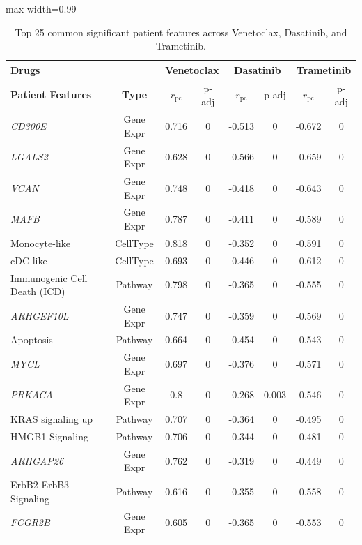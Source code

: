 \documentclass[sigconf,authordraft]{acmart}
\begin{document}
\begin{table}[!ht]
    \centering
    \caption{Top 25 common significant patient features across Venetoclax, Dasatinib, and Trametinib.}
    \label{tab:top25_top3_drugs}
    \scriptsize
    \begin{adjustbox}{max width=0.99\linewidth}
    \begin{tabular}{|l|c|c|c|c|c|c|c|}
        \hline
        \textbf{Drugs} & & \multicolumn{2}{|c|}{\textbf{Venetoclax}} & \multicolumn{2}{|c|}{\textbf{Dasatinib}} & \multicolumn{2}{|c|}{\textbf{Trametinib}} \\ \hline
        \textbf{Patient Features} & \textbf{Type} & $r_{\text{pc}}$ & p-adj & $r_{\text{pc}}$ & p-adj & $r_{\text{pc}}$ & p-adj \\ \hline
        \textit{CD300E} & Gene Expr & 0.716 & 0 & -0.513 & 0 & -0.672 & 0 \\ 
        \textit{LGALS2} & Gene Expr & 0.628 & 0 & -0.566 & 0 & -0.659 & 0 \\
        \textit{VCAN} & Gene Expr & 0.748 & 0 & -0.418 & 0 & -0.643 & 0 \\
        \textit{MAFB} & Gene Expr & 0.787 & 0 & -0.411 & 0 & -0.589 & 0 \\
        Monocyte-like & CellType & 0.818 & 0 & -0.352 & 0 & -0.591 & 0 \\
        cDC-like & CellType & 0.693 & 0 & -0.446 & 0 & -0.612 & 0 \\
        Immunogenic Cell Death (ICD) & Pathway & 0.798 & 0 & -0.365 & 0 & -0.555 & 0 \\
        \textit{ARHGEF10L} & Gene Expr & 0.747 & 0 & -0.359 & 0 & -0.569 & 0 \\
        Apoptosis & Pathway & 0.664 & 0 & -0.454 & 0 & -0.543 & 0 \\
        \textit{MYCL} & Gene Expr & 0.697 & 0 & -0.376 & 0 & -0.571 & 0 \\
        \textit{PRKACA} & Gene Expr & 0.8 & 0 & -0.268 & 0.003 & -0.546 & 0 \\
        KRAS signaling up & Pathway & 0.707 & 0 & -0.364 & 0 & -0.495 & 0 \\
        HMGB1 Signaling & Pathway & 0.706 & 0 & -0.344 & 0 & -0.481 & 0 \\
        \textit{ARHGAP26} & Gene Expr & 0.762 & 0 & -0.319 & 0 & -0.449 & 0 \\
        ErbB2 ErbB3 Signaling & Pathway & 0.616 & 0 & -0.355 & 0 & -0.558 & 0 \\
        \textit{FCGR2B} & Gene Expr & 0.605 & 0 & -0.365 & 0 & -0.553 & 0 \\

\end{tabular}
\end{adjustbox}
\end{table}
\end{document}
